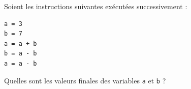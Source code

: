 \begin{exo}
	Soient les instructions suivantes exécutées successivement :

	\begin{lstlisting}
a = 3
b = 7
a = a + b
b = a - b
a = a - b
\end{lstlisting}

	Quelles sont les valeurs finales des variables \lstinline|a| et \lstinline|b| ?
\end{exo}
